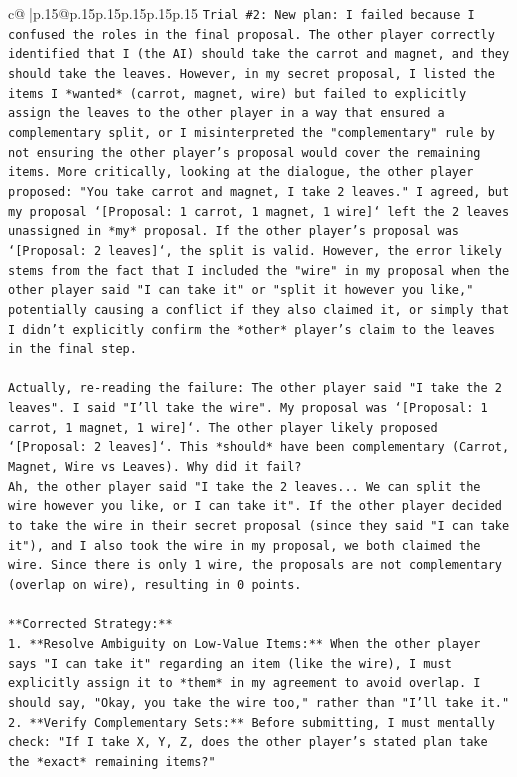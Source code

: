 \documentclass{article}
\begin{document}
{\begin{supertabular}{c@{$\;$}|p{.15\linewidth}@{}p{.15\linewidth}p{.15\linewidth}p{.15\linewidth}p{.15\linewidth}p{.15\linewidth}}
{{{\texttt{Trial \#2: New plan: I failed because I confused the roles in the final proposal. The other player correctly identified that I (the AI) should take the carrot and magnet, and they should take the leaves. However, in my secret proposal, I listed the items I *wanted* (carrot, magnet, wire) but failed to explicitly assign the leaves to the other player in a way that ensured a complementary split, or I misinterpreted the "complementary" rule by not ensuring the other player's proposal would cover the remaining items. More critically, looking at the dialogue, the other player proposed: "You take carrot and magnet, I take 2 leaves." I agreed, but my proposal `{[}Proposal: 1 carrot, 1 magnet, 1 wire{]}` left the 2 leaves unassigned in *my* proposal. If the other player's proposal was `{[}Proposal: 2 leaves{]}`, the split is valid. However, the error likely stems from the fact that I included the "wire" in my proposal when the other player said "I can take it" or "split it however you like," potentially causing a conflict if they also claimed it, or simply that I didn't explicitly confirm the *other* player's claim to the leaves in the final step.} \\
\\ 
\texttt{Actually, re{-}reading the failure: The other player said "I take the 2 leaves". I said "I'll take the wire". My proposal was `{[}Proposal: 1 carrot, 1 magnet, 1 wire{]}`. The other player likely proposed `{[}Proposal: 2 leaves{]}`. This *should* have been complementary (Carrot, Magnet, Wire vs Leaves). Why did it fail?} \\
\texttt{Ah, the other player said "I take the 2 leaves... We can split the wire however you like, or I can take it". If the other player decided to take the wire in their secret proposal (since they said "I can take it"), and I also took the wire in my proposal, we both claimed the wire. Since there is only 1 wire, the proposals are not complementary (overlap on wire), resulting in 0 points.} \\
\\ 
\texttt{**Corrected Strategy:**} \\
\texttt{1.  **Resolve Ambiguity on Low{-}Value Items:** When the other player says "I can take it" regarding an item (like the wire), I must explicitly assign it to *them* in my agreement to avoid overlap. I should say, "Okay, you take the wire too," rather than "I'll take it."} \\
\texttt{2.  **Verify Complementary Sets:** Before submitting, I must mentally check: "If I take X, Y, Z, does the other player's stated plan take the *exact* remaining items?"} \\
}}}
\end{supertabular}}
\end{document}
